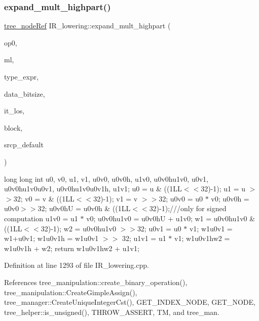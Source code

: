 \subsubsection{\texorpdfstring{expand\+\_\+mult\+\_\+highpart()}{expand\_mult\_highpart()}}
{\footnotesize\ttfamily \hyperlink{tree__node_8hpp_a6ee377554d1c4871ad66a337eaa67fd5}{tree\+\_\+node\+Ref} I\+R\+\_\+lowering\+::expand\+\_\+mult\+\_\+highpart (\begin{DoxyParamCaption}\item[{\hyperlink{tree__node_8hpp_a6ee377554d1c4871ad66a337eaa67fd5}{tree\+\_\+node\+Ref}}]{op0,  }\item[{unsigned long long int}]{ml,  }\item[{\hyperlink{tree__node_8hpp_a6ee377554d1c4871ad66a337eaa67fd5}{tree\+\_\+node\+Ref}}]{type\+\_\+expr,  }\item[{int}]{data\+\_\+bitsize,  }\item[{const std\+::list$<$ \hyperlink{tree__node_8hpp_a6ee377554d1c4871ad66a337eaa67fd5}{tree\+\_\+node\+Ref} $>$\+::const\+\_\+iterator}]{it\+\_\+los,  }\item[{const bloc\+Ref}]{block,  }\item[{const std\+::string \&}]{srcp\+\_\+default }\end{DoxyParamCaption})\hspace{0.3cm}{\ttfamily [private]}}

long long int u0, v0, u1, v1, u0v0, u0v0h, u1v0, u0v0hu1v0, u0v1, u0v0hu1v0u0v1, u0v0hu1v0u0v1h, u1v1; u0 = u \& ((1\+LL$<$$<$32)-\/1); u1 = u $>$$>$32; v0 = v \& ((1\+LL$<$$<$32)-\/1); v1 = v $>$$>$32; u0v0 = u0 $\ast$ v0; u0v0h = u0v0$>$$>$32; u0v0hU = u0v0h \& ((1\+LL$<$$<$32)-\/1);///only for signed computation u1v0 = u1 $\ast$ v0; u0v0hu1v0 = u0v0hU + u1v0; w1 = u0v0hu1v0 \& ((1\+LL$<$$<$32)-\/1); w2 = u0v0hu1v0 $>$$>$32; u0v1 = u0 $\ast$ v1; w1u0v1 = w1+u0v1; w1u0v1h = w1u0v1 $>$$>$ 32; u1v1 = u1 $\ast$ v1; w1u0v1hw2 = w1u0v1h + w2; return w1u0v1hw2 + u1v1;

Definition at line 1293 of file I\+R\+\_\+lowering.\+cpp.



References tree\+\_\+manipulation\+::create\+\_\+binary\+\_\+operation(), tree\+\_\+manipulation\+::\+Create\+Gimple\+Assign(), tree\+\_\+manager\+::\+Create\+Unique\+Integer\+Cst(), G\+E\+T\+\_\+\+I\+N\+D\+E\+X\+\_\+\+N\+O\+DE, G\+E\+T\+\_\+\+N\+O\+DE, tree\+\_\+helper\+::is\+\_\+unsigned(), T\+H\+R\+O\+W\+\_\+\+A\+S\+S\+E\+RT, TM, and tree\+\_\+man.



